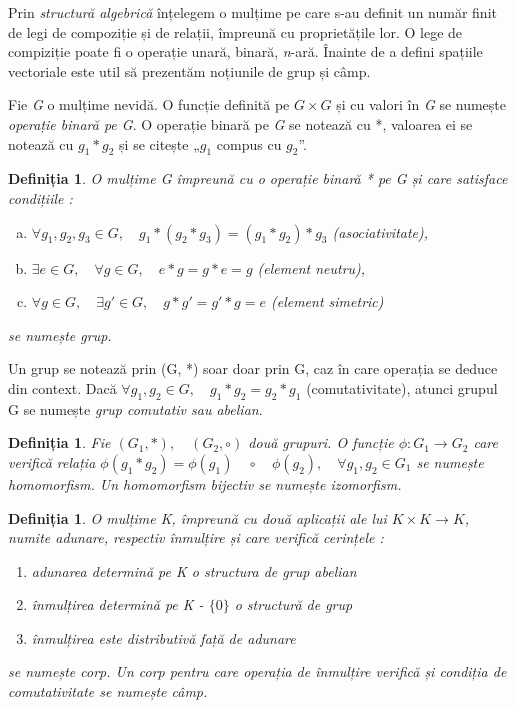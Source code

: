 Prin \textit{structură algebrică} înțelegem o mulțime pe care s-au definit un
număr finit de legi de compoziție și de relații, împreună cu proprietățile lor.
O lege de compiziție poate fi o operație unară, binară, \textit{n}-ară.
Înainte de a defini spațiile vectoriale este util să prezentăm noțiunile de grup
și câmp.

\indent
Fie \textit{G} o mulțime nevidă. O funcție definită pe $\mathit{G \times G}$ și
cu valori în \textit{G} se numește \textit{operație binară pe G}. O operație
binară pe \textit{G} se notează cu *, valoarea ei se notează cu $\mathit{g_1 *
g_2}$ și se citește „$\mathit{g_1}$ compus cu $\mathit{g_2}$”.

\newtheorem{def_group}[def_dotproduct]{Definiția}
\begin{def_group}
O mulțime G împreună cu o operație binară * pe G și care satisface condițiile :
\begin{enumerate}[(a)]
  \item $\forall g_1, g_2, g_3 \in G, \quad g_1 * (g_2 * g_3) = (g_1 * g_2) *
  g_3$ (asociativitate),
  \item $\exists e \in G, \quad \forall g \in G, \quad e * g = g * e = g$
  (element neutru),
  \item $\forall g \in G, \quad \exists g' \in G, \quad g * g' = g' * g = e$
  (element simetric) \end{enumerate} se numește grup.
\end{def_group}
Un grup se notează prin (G, *) soar doar prin G, caz în care operația se deduce
din context.
Dacă $\forall g_1, g_2 \in G, \quad g_1 * g_2 = g_2 * g_1$ (comutativitate),
atunci grupul G se numește \textit{grup comutativ sau abelian}.

\newtheorem{def_isomorph}[def_dotproduct]{Definiția}
\begin{def_isomorph}
Fie $(G_1, *), \quad (G_2, \circ)$ două grupuri. O funcție $\phi : G_1
\rightarrow G_2$ care verifică relația $\phi(g_1 * g_2) = \phi(g_1) \quad \circ \quad
\phi(g_2), \quad \forall g_1, g_2 \in G_1$ se numește homomorfism. Un
homomorfism bijectiv se numește izomorfism.
\end{def_isomorph}

\newtheorem{def_field}[def_dotproduct]{Definiția}
\begin{def_field}
O mulțime K, împreună cu două aplicații ale lui $K \times K \rightarrow K$,
numite adunare, respectiv înmulțire și care verifică cerințele :
\begin{enumerate}
  \item adunarea determină pe K o structura de grup abelian
  \item înmulțirea determină pe K - $\lbrace 0 \rbrace$ o structură de grup
  \item înmulțirea este distributivă față de adunare
\end{enumerate} se numește corp. Un corp pentru care operația de înmulțire
verifică și condiția de comutativitate se numește câmp.
\end{def_field}

